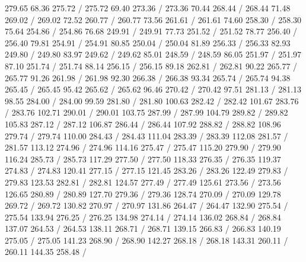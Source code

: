 { 279.65 68.36 275.72 /
 275.72 69.40 273.36 /
 273.36 70.44 268.44 /
 268.44 71.48 269.02 /
 269.02 72.52 260.77 /
 260.77 73.56 261.61 /
 261.61 74.60 258.30 /
 258.30 75.64 254.86 /
 254.86 76.68 249.91 /
 249.91 77.73 251.52 /
 251.52 78.77 256.40 /
 256.40 79.81 254.91 /
 254.91 80.85 250.04 /
 250.04 81.89 256.33 /
 256.33 82.93 249.80 /
 249.80 83.97 249.62 /
 249.62 85.01 248.59 /
 248.59 86.05 251.97 /
 251.97 87.10 251.74 /
 251.74 88.14 256.15 /
 256.15 89.18 262.81 /
 262.81 90.22 265.77 /
 265.77 91.26 261.98 /
 261.98 92.30 266.38 /
 266.38 93.34 265.74 /
 265.74 94.38 265.45 /
 265.45 95.42 265.62 /
 265.62 96.46 270.42 /
 270.42 97.51 281.13 /
 281.13 98.55 284.00 /
 284.00 99.59 281.80 /
 281.80 100.63 282.42 /
 282.42 101.67 283.76 /
 283.76 102.71 290.01 /
 290.01 103.75 287.99 /
 287.99 104.79 289.82 /
 289.82 105.83 287.12 /
 287.12 106.87 286.44 /
 286.44 107.92 288.82 /
 288.82 108.96 279.74 /
 279.74 110.00 284.43 /
 284.43 111.04 283.39 /
 283.39 112.08 281.57 /
 281.57 113.12 274.96 /
 274.96 114.16 275.47 /
 275.47 115.20 279.90 /
 279.90 116.24 285.73 /
 285.73 117.29 277.50 /
 277.50 118.33 276.35 /
 276.35 119.37 274.83 /
 274.83 120.41 277.15 /
 277.15 121.45 283.26 /
 283.26 122.49 279.83 /
 279.83 123.53 282.81 /
 282.81 124.57 277.49 /
 277.49 125.61 273.56 /
 273.56 126.65 280.89 /
 280.89 127.70 279.36 /
 279.36 128.74 270.09 /
 270.09 129.78 269.72 /
 269.72 130.82 270.97 /
 270.97 131.86 264.47 /
 264.47 132.90 275.54 /
 275.54 133.94 276.25 /
 276.25 134.98 274.14 /
 274.14 136.02 268.84 /
 268.84 137.07 264.53 /
 264.53 138.11 268.71 /
 268.71 139.15 266.83 /
 266.83 140.19 275.05 /
 275.05 141.23 268.90 /
 268.90 142.27 268.18 /
 268.18 143.31 260.11 /
 260.11 144.35 258.48 /
}
